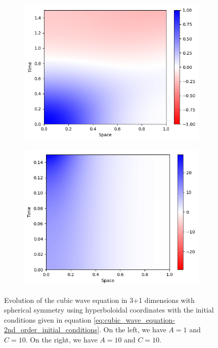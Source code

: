 \begin{figure}[h]
    \centering
    \begin{subfigure}[b]{0.45\textwidth}
        \centering
        \includegraphics[width=\textwidth]{Images/Cubic_Wave_Equation_3+1_Spherical-A=1-Solution.png}
    \end{subfigure}
    \hfill
    \begin{subfigure}[b]{0.45\textwidth}
        \centering
        \includegraphics[width=\textwidth]{Images/Cubic_Wave_Equation_3+1_Spherical-A=10-Solution.png}
    \end{subfigure}
    \caption{Evolution of the cubic wave equation in 3+1 dimensions with spherical symmetry using hyperboloidal coordinates with the initial conditions given in equation \eqref{eq:cubic_wave_equation-2nd_order_initial_conditions}. On the left, we have $A=1$ and $C=10$. On the right, we have  $A=10$ and $C=10$.}
    \label{fig:cubic_wave_eq}
\end{figure}

